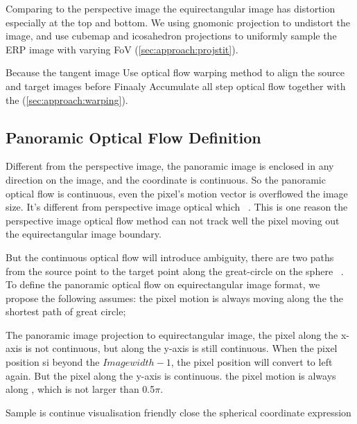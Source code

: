 Comparing to the perspective image the equirectangular image has distortion especially at the top and bottom.
We using gnomonic projection to  undistort the image, and use cubemap and icosahedron projections to uniformly sample the ERP image with varying FoV (\cref{sec:approach:projstit}).

Because the tangent image 
Use optical flow warping method to align the source and target images before
Finaaly Accumulate all step optical flow together with the  (\cref{sec:approach:warping}).



\subsection{Panoramic Optical Flow Definition}
\label{sec:approach:definition}

Different from the perspective image, the panoramic image is enclosed in any direction on the image,  and the coordinate is continuous.
So the panoramic optical flow is continuous, even the pixel's motion vector is overflowed the image size.
It's different from perspective image optical which ~\cite{??}. 
This is one reason the perspective image optical flow method can not track well the pixel moving out the equirectangular image boundary.

But the continuous optical flow will introduce ambiguity, 
there are two paths from the source point to the target point along the great-circle on the sphere ~\cite{??}.
To define the panoramic optical flow on equirectangular image format, we propose the following assumes:
the pixel motion is always moving along the the shortest path of great circle;

The panoramic image projection to equirectangular image, the pixel along the x-axis is not continuous, but along the y-axis is still continuous. When the pixel position si beyond the  ${Imagewidth -1}$, the pixel position will convert to left again.
But the pixel along the y-axis is continuous.
the pixel motion is always along , which is not larger than 0.5$\pi$.

Sample is continue 
visualisation friendly
close the spherical coordinate expression

